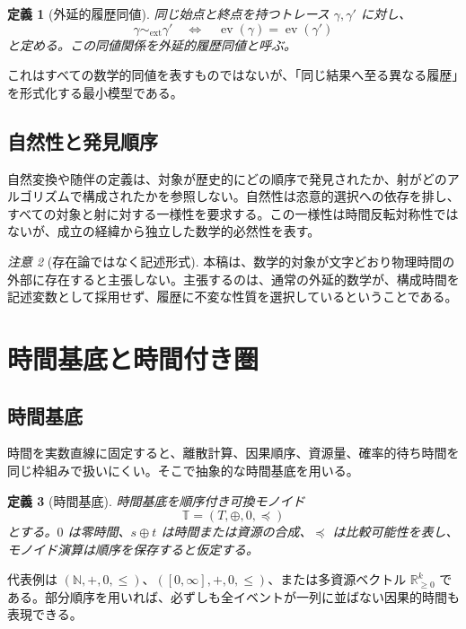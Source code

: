 \documentclass[a4paper,11pt]{ltjsarticle}
\newtheorem{definition}{定義}[section]
\theoremstyle{remark}
\newtheorem{remark}[definition]{注意}
\newcommand{\T}{\mathbb T}
\newcommand{\N}{\mathbb N}
\newcommand{\R}{\mathbb R}
\newcommand{\ev}{\operatorname{ev}}
\begin{document}
\begin{definition}[外延的履歴同値]
同じ始点と終点を持つトレース $\gamma,\gamma'$ に対し、
\begin{equation}
 \gamma\sim_{\mathrm{ext}}\gamma'
 \quad\Longleftrightarrow\quad
 \ev(\gamma)=\ev(\gamma')
 \label{eq:extensional-equivalence}
\end{equation}
と定める。この同値関係を\emph{外延的履歴同値}と呼ぶ。
\end{definition}

これはすべての数学的同値を表すものではないが、「同じ結果へ至る異なる履歴」を形式化する最小模型である。

\subsection{自然性と発見順序}
自然変換や随伴の定義は、対象が歴史的にどの順序で発見されたか、射がどのアルゴリズムで構成されたかを参照しない。自然性は恣意的選択への依存を排し、すべての対象と射に対する一様性を要求する。この一様性は時間反転対称性ではないが、成立の経緯から独立した数学的必然性を表す。

\begin{remark}[存在論ではなく記述形式]
本稿は、数学的対象が文字どおり物理時間の外部に存在すると主張しない。主張するのは、通常の外延的数学が、構成時間を記述変数として採用せず、履歴に不変な性質を選択しているということである。
\end{remark}

\section{時間基底と時間付き圏}

\subsection{時間基底}
時間を実数直線に固定すると、離散計算、因果順序、資源量、確率的待ち時間を同じ枠組みで扱いにくい。そこで抽象的な時間基底を用いる。

\begin{definition}[時間基底]
時間基底を順序付き可換モノイド
\begin{equation}
 \T=(T,\oplus,0,\preceq)
\end{equation}
とする。$0$ は零時間、$s\oplus t$ は時間または資源の合成、$\preceq$ は比較可能性を表し、モノイド演算は順序を保存すると仮定する。
\end{definition}

代表例は $(\N,+,0,\leq)$、$([0,\infty],+,0,\leq)$、または多資源ベクトル $\R_{\geq0}^k$ である。部分順序を用いれば、必ずしも全イベントが一列に並ばない因果的時間も表現できる。
\end{document}
